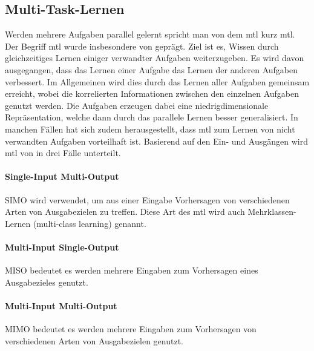 		\subsection{Multi-Task-Lernen}
		Werden mehrere Aufgaben parallel gelernt spricht man von dem \acl{mtl} kurz \ac{mtl}. Der Begriff \ac{mtl} wurde insbesondere von \cite{Caruana.1998} geprägt. Ziel ist es, Wissen durch gleichzeitiges Lernen einiger verwandter Aufgaben weiterzugeben. Es wird davon ausgegangen, dass das Lernen einer Aufgabe das Lernen der anderen Aufgaben verbessert. Im Allgemeinen wird dies durch das Lernen aller Aufgaben gemeinsam erreicht, wobei die korrelierten Informationen zwischen den einzelnen Aufgaben genutzt werden. Die Aufgaben erzeugen dabei eine niedrigdimensionale Repräsentation, welche dann durch das parallele Lernen besser generalisiert. In manchen Fällen hat sich zudem herausgestellt, dass \acl{mtl} zum Lernen von nicht verwandten Aufgaben vorteilhaft ist.
		Basierend auf den Ein- und Ausgängen wird \ac{mtl} von \cite{Thung.2018} in drei Fälle unterteilt. 
 		
 		\paragraph{Single-Input Multi-Output} SIMO wird verwendet, um aus einer Eingabe Vorhersagen von verschiedenen Arten von Ausgabezielen zu treffen. Diese Art des \ac{mtl} wird auch Mehrklassen-Lernen (multi-class learning) genannt.
		
		\paragraph{Multi-Input Single-Output} MISO bedeutet es werden mehrere Eingaben zum Vorhersagen eines Ausgabezieles genutzt.
	
		\paragraph{Multi-Input Multi-Output} MIMO bedeutet es werden mehrere Eingaben zum Vorhersagen von verschiedenen Arten von Ausgabezielen genutzt.
		
